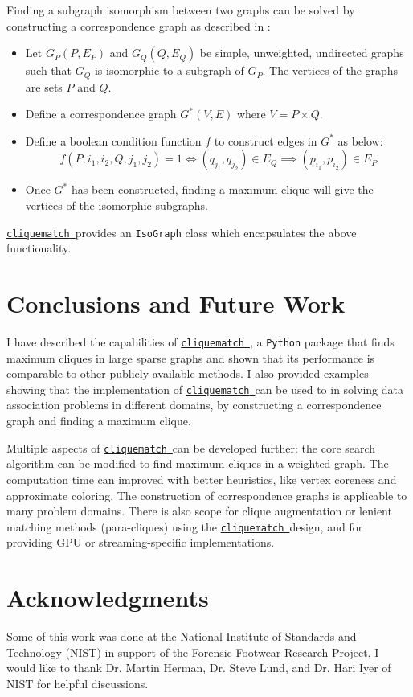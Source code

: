 \documentclass[12pt]{article}
\newcommand{\clqm}{\href{https://github.com/ahgamut/cliquematch}{\texttt{cliquematch}~}}
\begin{document}
Finding a subgraph isomorphism between two graphs can be solved by constructing a
correspondence graph as described in \citep{kozen1978clique}:

\begin{itemize}
	\item Let $G_P(P, E_P)$ and $G_Q(Q, E_Q)$ be simple, unweighted, undirected
	      graphs such that $G_Q$ is isomorphic to a subgraph of
	      $G_P$. The vertices of the graphs are sets $P$ and
	      $Q$.
	\item Define a correspondence graph $G^*(V,E)$ where $V = P \times Q$.
	\item Define a boolean condition function $f$ to construct edges in
	      $G^*$ as below: $$ f(P, i_1, i_2, Q, j_1, j_2) = 1 \iff (q_{j_1}, q_{j_2}) \in E_Q \implies (p_{i_1}, p_{i_2}) \in
		      E_P $$
	\item Once $G^*$ has been constructed, finding a maximum clique will give the
	      vertices of the isomorphic subgraphs.
\end{itemize}

\clqm provides an \texttt{IsoGraph} class which encapsulates the above
functionality.

\section{Conclusions and Future Work}%
\label{sec:conclusions}
I have described the capabilities of \clqm, a \texttt{Python} package that finds
maximum cliques in large sparse graphs and shown that its performance is comparable to
other publicly available methods. I also provided examples showing that the
implementation of \clqm can be used to in solving data association problems in different
domains, by constructing a correspondence graph and finding a maximum clique.

Multiple aspects of \clqm can be developed further: the core search algorithm can be
modified to find maximum cliques in a weighted graph. The computation time can improved
with better heuristics, like vertex coreness and approximate coloring. The construction
of correspondence graphs is applicable to many problem domains. There is also scope for
clique augmentation or lenient matching methods (para-cliques) using the \clqm design,
and for providing GPU or streaming-specific implementations.

\section*{Acknowledgments}
Some of this work was done at the National Institute of Standards and Technology (NIST)
in support of the Forensic Footwear Research Project. I would like to thank Dr. Martin
Herman, Dr. Steve Lund, and Dr. Hari Iyer of NIST for helpful discussions.
\end{document}
